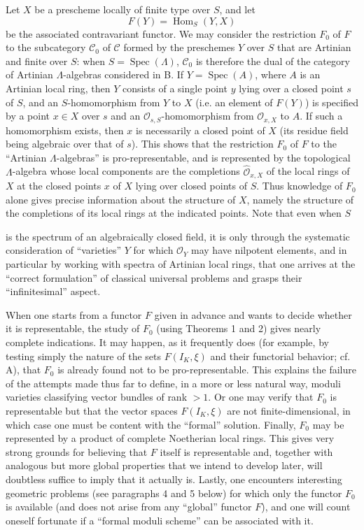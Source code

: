 Let $X$ be a prescheme locally of finite type over $S$, and let
\[
  F(Y)=\operatorname{Hom}_S(Y,X)
\]
be the associated contravariant functor. We may consider the restriction $F_0$
of $F$ to the subcategory $\mathcal C_0$ of $\mathcal C$ formed by the
preschemes $Y$ over $S$ that are Artinian and finite over $S$: when
$S=\operatorname{Spec}(\Lambda)$, $\mathcal C_0$ is therefore the dual of the
category of Artinian $\Lambda$-algebras considered in B. If
$Y=\operatorname{Spec}(A)$, where $A$ is an Artinian local ring, then $Y$
consists of a single point $y$ lying over a closed point $s$ of $S$, and an
$S$-homomorphism from $Y$ to $X$ (i.e. an element of $F(Y)$) is specified by a
point $x\in X$ over $s$ and an $\mathcal O_{s,S}$-homomorphism from
$\mathcal O_{x,X}$ to $A$. If such a homomorphism exists, then $x$ is
necessarily a closed point of $X$ (its residue field being algebraic over that
of $s$). This shows that the restriction $F_0$ of $F$ to the “Artinian
$\Lambda$-algebras” is pro-representable, and is represented by the topological
$\Lambda$-algebra whose local components are the completions
$\widehat{\mathcal O}_{x,X}$ of the local rings of $X$ at the closed points
$x$ of $X$ lying over closed points of $S$. Thus knowledge of $F_0$ alone gives
precise information about the structure of $X$, namely the structure of the
completions of its local rings at the indicated points. Note that even when
$S$

is the spectrum of an algebraically closed field, it is only through the
systematic consideration of “varieties” $Y$ for which $\mathcal O_Y$ may have
nilpotent elements, and in particular by working with spectra of Artinian local
rings, that one arrives at the “correct formulation” of classical universal
problems and grasps their “infinitesimal” aspect.

When one starts from a functor $F$ given in advance and wants to decide whether
it is representable, the study of $F_0$ (using Theorems 1 and 2) gives nearly
complete indications. It may happen, as it frequently does (for example, by
testing simply the nature of the sets $F(I_K,\xi)$ and their functorial
behavior; cf. A), that $F_0$ is already found not to be pro-representable. This
explains the failure of the attempts made thus far to define, in a more or less
natural way, moduli varieties classifying vector bundles of rank $>1$. Or one
may verify that $F_0$ is representable but that the vector spaces
$F(I_K,\xi)$ are not finite-dimensional, in which case one must be content
with the “formal” solution. Finally, $F_0$ may be represented by a product of
complete Noetherian local rings. This gives very strong grounds for believing
that $F$ itself is representable and, together with analogous but more global
properties that we intend to develop later, will doubtless suffice to imply
that it actually is. Lastly, one encounters interesting geometric problems
(see paragraphs 4 and 5 below) for which only the functor $F_0$ is available
(and does not arise from any “global” functor $F$), and one will count oneself
fortunate if a “formal moduli scheme” can be associated with it.

